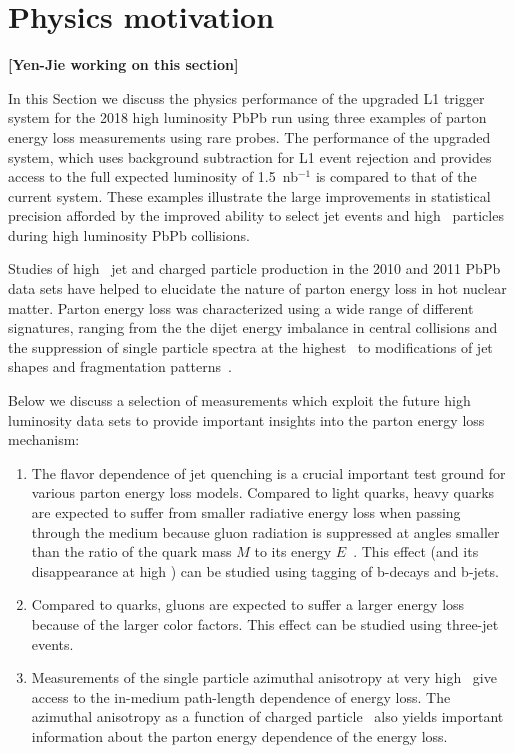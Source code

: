 \section{Physics motivation\label{sec:physHI}}
\label{sec:physics}

{\bf [Yen-Jie working on this section]}

In this Section we discuss the physics performance of the upgraded L1 trigger system for the 2018 high luminosity PbPb run
using three examples of parton energy loss measurements using rare probes. 
The performance of the upgraded system, which uses background subtraction for L1 event rejection and provides 
access to the full expected luminosity of 1.5~nb$^{-1}$ is compared to that of the current system. 
These examples illustrate the large improvements in statistical precision afforded by the  improved 
ability to select jet events and high \pt\ particles during high luminosity PbPb collisions. 


Studies of high \pt\ jet and charged particle production in the 2010 and 2011 PbPb data sets have helped to elucidate the nature of parton energy loss in hot nuclear matter. Parton energy loss was characterized using a wide range 
of different signatures, ranging from the the dijet energy imbalance in central collisions and the suppression of single particle
spectra at the highest \pt\ to modifications of jet shapes and fragmentation patterns~\cite{Chatrchyan:2011sx,Aamodt:2010jd,Alice:dihadron,CMS:2012aa,Chatrchyan:2012nia,Aad:2010bu,atlas:2012is,Chatrchyan:2012gt,Chatrchyan:2012gw}. 

Below we discuss a selection of measurements which exploit the future high luminosity data sets to 
provide important insights into the parton energy loss mechanism:

\begin{enumerate}
\item The flavor dependence of jet quenching is a crucial important test ground for various parton energy loss models. 
Compared to light quarks, heavy quarks are expected to suffer from smaller radiative energy loss when passing 
through the medium because gluon radiation is suppressed at angles smaller than the ratio of the quark mass $M$ to 
its energy $E$~\cite{Dokshitzer:2001zm}. This effect (and its disappearance at high \pt) can be studied using tagging
of b-decays and b-jets.
\item Compared to quarks, gluons are expected to suffer a larger 
energy loss because of the larger color factors. This effect can be studied using three-jet events.
\item Measurements of the single particle azimuthal anisotropy at very high \pt\ give access to the in-medium path-length 
dependence of energy loss. The azimuthal anisotropy as a function of charged particle \pt\ also yields 
important information about the parton energy dependence of the energy loss.
\end{enumerate}

